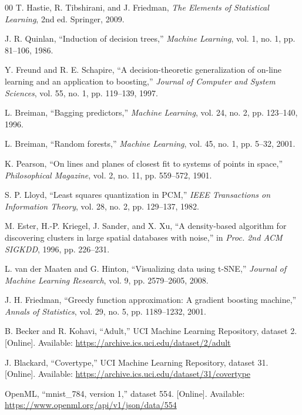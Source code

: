 \documentclass[conference]{IEEEtran}
\begin{document}
\clearpage
\begin{thebibliography}{00}
T. Hastie, R. Tibshirani, and J. Friedman, \emph{The Elements of Statistical
Learning}, 2nd ed. Springer, 2009.

J. R. Quinlan, ``Induction of decision trees,'' \emph{Machine Learning},
vol. 1, no. 1, pp. 81--106, 1986.

Y. Freund and R. E. Schapire, ``A decision-theoretic generalization of
on-line learning and an application to boosting,'' \emph{Journal of Computer
and System Sciences}, vol. 55, no. 1, pp. 119--139, 1997.

L. Breiman, ``Bagging predictors,'' \emph{Machine Learning}, vol. 24, no. 2,
pp. 123--140, 1996.

L. Breiman, ``Random forests,'' \emph{Machine Learning}, vol. 45, no. 1,
pp. 5--32, 2001.

K. Pearson, ``On lines and planes of closest fit to systems of points in
space,'' \emph{Philosophical Magazine}, vol. 2, no. 11, pp. 559--572, 1901.

S. P. Lloyd, ``Least squares quantization in PCM,'' \emph{IEEE Transactions
on Information Theory}, vol. 28, no. 2, pp. 129--137, 1982.

M. Ester, H.-P. Kriegel, J. Sander, and X. Xu, ``A density-based algorithm
for discovering clusters in large spatial databases with noise,'' in
\emph{Proc. 2nd ACM SIGKDD}, 1996, pp. 226--231.

L. van der Maaten and G. Hinton, ``Visualizing data using t-SNE,''
\emph{Journal of Machine Learning Research}, vol. 9, pp. 2579--2605, 2008.

J. H. Friedman, ``Greedy function approximation: A gradient boosting
machine,'' \emph{Annals of Statistics}, vol. 29, no. 5, pp. 1189--1232, 2001.

B. Becker and R. Kohavi, ``Adult,'' UCI Machine Learning Repository, dataset
2. [Online]. Available: \url{https://archive.ics.uci.edu/dataset/2/adult}

J. Blackard, ``Covertype,'' UCI Machine Learning Repository, dataset 31.
[Online]. Available: \url{https://archive.ics.uci.edu/dataset/31/covertype}

OpenML, ``mnist\_784, version 1,'' dataset 554. [Online]. Available:
\url{https://www.openml.org/api/v1/json/data/554}
\end{thebibliography}
\end{document}
